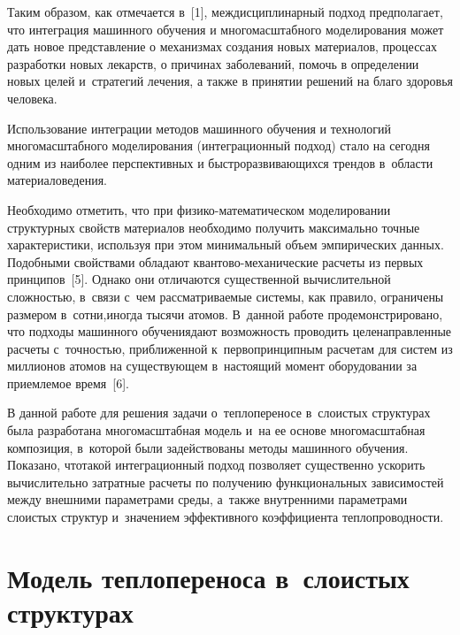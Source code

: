 \begin{multicols}{2}
    Таким образом, как отмечается в~[1], меж\-дис\-цип\-ли\-нар\-ный подход 
предполагает, что интеграция машинного обучения и многомасштабного 
моделирования может дать новое представление о механизмах создания новых 
материалов, процессах разработки новых лекарств, о причинах заболеваний, 
помочь в определении новых целей и~стратегий лечения, а также в принятии 
решений на благо здоровья человека. 
    
    Использование интеграции методов машинного обучения и технологий 
многомасштабного моделирования (интеграционный подход) стало на сегодня 
одним из наиболее перспективных и быстроразвивающихся трендов в~области 
материаловедения. 
    
    Необходимо отметить, что при физико-ма\-те\-ма\-ти\-че\-ском моделировании 
структурных свойств материалов необходимо получить максимально точные 
характеристики, используя при этом \mbox{минимальный} объем эмпирических данных. 
Подобными свойствами обладают кван\-то\-во-ме\-ха\-ни\-че\-ские расчеты из 
первых принципов~[5]. Однако они отличаются существенной вычислительной 
сложностью, в~связи с~чем рассматриваемые сис\-те\-мы, как правило, ограничены 
размером в~сотни,\linebreak иногда тысячи атомов. В~данной работе 
продемонстрировано, что подходы машинного обучения\linebreak дают возможность 
проводить целенаправленные расчеты с~точ\-ностью, приближенной 
к~первопринципным расчетам для систем из миллионов атомов на существующем 
в~настоящий момент оборудовании за приемлемое время~[6].
    
    В данной работе для решения задачи о~теплопереносе в~слоистых 
структурах была разработана многомасштабная модель и~на ее основе 
многомасштабная композиция, в~которой были задействованы методы 
машинного обучения. Показано, что\linebreak такой интеграционный подход позволяет 
существенно ускорить вычислительно затратные расчеты по получению 
функциональных зависимостей между внеш\-ни\-ми па\-ра\-мет\-ра\-ми среды, а~так\-же 
внут\-рен\-ни\-ми параметрами сло\-истых структур и~значением эффективного 
коэффициента теп\-ло\-про\-вод\-ности.

\vspace*{-6pt}

\section{Модель теплопереноса в~слоистых структурах}


\end{multicols}
